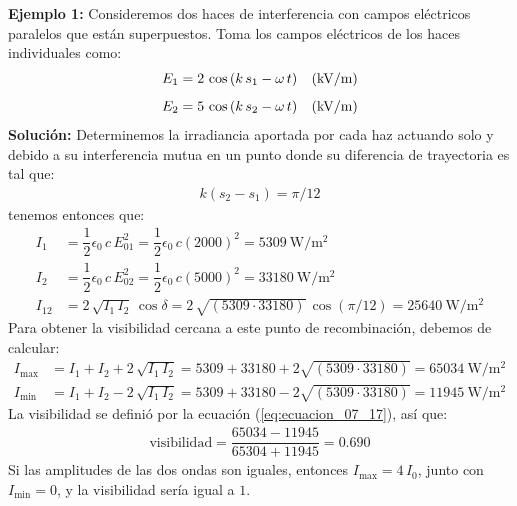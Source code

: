 \documentclass[14pt]{extarticle}
\begin{document}
\vspace{0.5cm}
\noindent
\textbf{Ejemplo 1:} Consideremos dos haces de interferencia con campos eléctricos paralelos que están superpuestos. Toma los campos eléctricos de los haces individuales como:
\begin{align*}
E_{1} &= 2 \, \cos \left( k \, s_{1} - \omega \, t \right) \hspace{0.3cm} (\unit{\kilo\volt\per\metre}) \\[0.5em]
E_{2} &= 5 \, \cos \left( k \, s_{2} - \omega \, t \right) \hspace{0.3cm} (\unit{\kilo\volt\per\metre})
\end{align*}
\noindent
\textbf{Solución:}
Determinemos la irradiancia aportada por cada haz actuando solo y debido a su interferencia mutua en un punto donde su diferencia de trayectoria es tal que:
\begin{align*}
k \left( s_{2} - s_{1} \right) = \pi / 12
\end{align*}
tenemos entonces que:
\begin{align*}
I_{1} &= \dfrac{1}{2} \epsilon_{0} \, c \, E_{01}^{2} = \dfrac{1}{2} \epsilon_{0} \, c \left( 2000 \right)^{2} = \SI{5309}{\watt\per\square\meter} \\[0.5em]
I_{2} &= \dfrac{1}{2} \epsilon_{0} \, c \, E_{02}^{2} = \dfrac{1}{2} \epsilon_{0} \, c \left( 5000 \right)^{2} = \SI{33180}{\watt\per\square\meter} \\[0.5em]
I_{12} &= 2 \, \sqrt{I_{1} \, I_{2}} \, \cos \delta = 2 \, \sqrt{(5309 \cdot 33180)} \, \cos (\pi/12) = \SI{25640}{\watt\per\square\meter}
\end{align*}
Para obtener la visibilidad cercana a este punto de recombinación, debemos de calcular:
\begin{align*}
I_{\max} &= I_{1} + I_{2} + 2 \, \sqrt{I_{1} \, I_{2}} = 5309 + 33180 + 2 \sqrt{(5309 \cdot 33180)} =  \SI{65034}{\watt\per\square\meter} \\[0.5em]
I_{\min} &= I_{1} + I_{2} - 2 \, \sqrt{I_{1} \, I_{2}} = 5309 + 33180 - 2 \sqrt{(5309 \cdot 33180)} =  \SI{11945}{\watt\per\square\meter}
\end{align*}
La visibilidad se definió por la ecuación (\ref{eq:ecuacion_07_17}), así que:
\begin{align*}
\text{visibilidad} = \dfrac{65034 - 11945}{65304 + 11945} = 0.690
\end{align*}
Si las amplitudes de las dos ondas son iguales, entonces $I_{\max} = 4 \, I_{0}$, junto con $I_{\min} = 0$, y la visibilidad sería igual a $1$.
\end{document}
